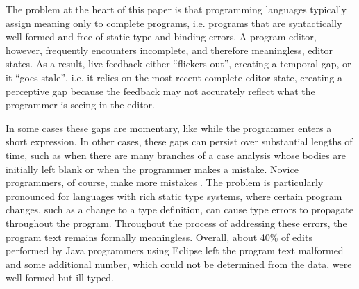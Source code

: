 %
The problem at the heart of this paper is that
programming languages typically assign meaning only to {complete programs}, i.e. programs that are syntactically well-formed and free of static type and binding errors. A program editor, however, frequently encounters incomplete, and therefore meaningless, editor states. As a result, live feedback either ``flickers out'', creating a temporal gap, or it ``goes stale'', i.e. it relies on the most recent complete editor state, creating a perceptive gap because the feedback may not accurately reflect what the programmer is seeing in the editor.

In some cases these gaps are momentary, like while the programmer
enters
a short expression. In other cases, these gaps can persist over substantial lengths of time, such as when there are many branches of a case analysis whose bodies are initially left blank or when the programmer makes a mistake.
%
Novice programmers, of course, make more mistakes \cite{mccauley2008debugging,fitzgerald2008debugging}.
%
The problem is particularly pronounced for languages with rich static type systems, where certain program changes, such as a change to a type definition, can cause type errors to propagate throughout the program. Throughout the process of addressing these errors, the program text remains formally meaningless. 
Overall, about 40\% of edits performed by Java programmers using Eclipse left the program text malformed \cite{popl-paper,6883030} and some additional number, which could not be determined from the data, were well-formed but ill-typed.


